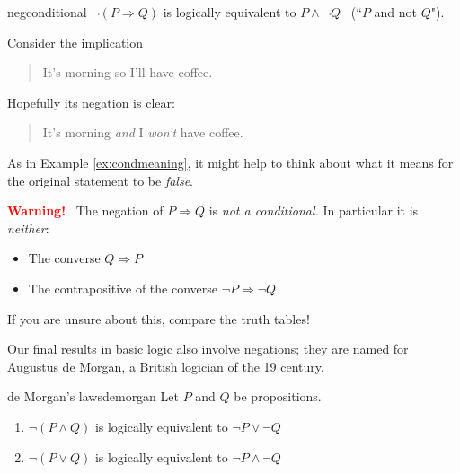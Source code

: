 \begin{thm}{}{negconditional}
	$\neg(P\Longrightarrow Q)$ is logically equivalent to $P\wedge\neg Q$ \ (``$P$ and not $Q$").
\end{thm}

\vspace{-5pt}


\goodbreak


\begin{example}{}{}
	Consider the implication
	\begin{quote}
	  It's morning so I'll have coffee.
	\end{quote}
	Hopefully its negation is clear:
	\begin{quote}
	  It's morning \emph{and} I \emph{won't} have coffee.
	\end{quote}
	As in Example \ref{ex:condmeaning}, it might help to think about what it means for the original statement to be \emph{false}.
\end{example}

\begin{tcolorbox}
	{\bf \textcolor{red}{Warning!}} \ The negation of $P\Longrightarrow Q$ is \emph{not a conditional.} In particular it is \emph{neither}:
	\begin{itemize}\itemsep2pt
	  \item The converse $Q\Longrightarrow P$
	  \item The contrapositive of the converse $\neg P\Longrightarrow\neg Q$
	\end{itemize}
	If you are unsure about this, compare the truth tables!
\end{tcolorbox}

\bigbreak


Our final results in basic logic also involve negations; they are named for Augustus de Morgan, a British logician of the 19\th{} century.

\begin{thm}{de Morgan's laws}{demorgan}
	Let $P$ and $Q$ be propositions.
	\begin{enumerate}\itemsep2pt
	  \item $\neg(P\wedge Q)$ is logically equivalent to $\neg P\vee\neg Q$
	  \item $\neg(P\vee Q)$ is logically equivalent to $\neg P\wedge\neg Q$
	\end{enumerate}
\end{thm}

